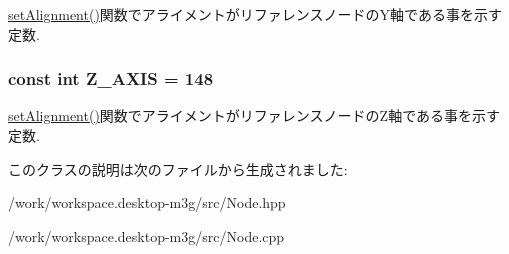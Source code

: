 \hyperlink{classm3g_1_1Node_dd1627aba90e63c166ecd3d7463d735a}{setAlignment()}関数でアライメントがリファレンスノードのY軸である事を示す定数. \hypertarget{classm3g_1_1Node_a928e648c9ae9b4706937831f77f0c67}{
\subsubsection[{Z\_\-AXIS}]{\setlength{\rightskip}{0pt plus 5cm}const int {\bf Z\_\-AXIS} = 148}}
\label{classm3g_1_1Node_a928e648c9ae9b4706937831f77f0c67}


\hyperlink{classm3g_1_1Node_dd1627aba90e63c166ecd3d7463d735a}{setAlignment()}関数でアライメントがリファレンスノードのZ軸である事を示す定数. 

このクラスの説明は次のファイルから生成されました:\begin{CompactItemize}
\item 
/work/workspace.desktop-m3g/src/Node.hpp\item 
/work/workspace.desktop-m3g/src/Node.cpp\end{CompactItemize}
